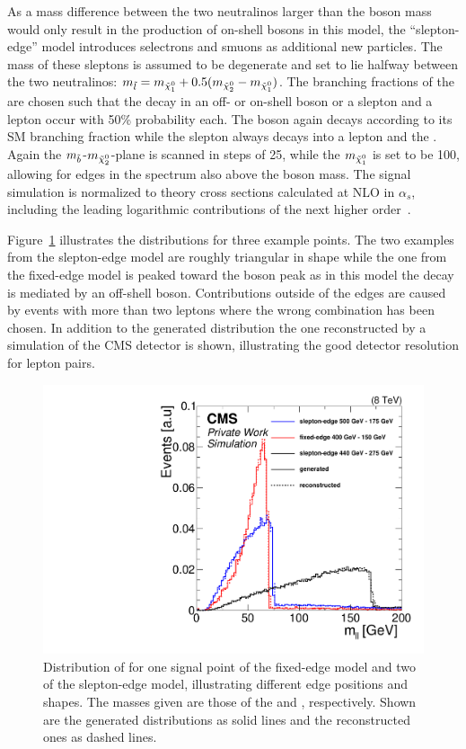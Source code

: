 As a mass difference between the two neutralinos larger than the \Z boson mass would only result in the production of on-shell \Z bosons in this model, the ``slepton-edge'' model introduces selectrons and smuons as additional new particles. The mass of these sleptons is assumed to be degenerate and set to lie halfway between the two neutralinos: $m_{\tilde{l}} = m_{{\tilde{\chi}^0_1}} + 0.5(m_{{\tilde{\chi}^0_2}}-m_{{\tilde{\chi}^0_1}})$. The branching fractions of the \secondchi are chosen such that the decay in an off- or on-shell \Z boson or a slepton and a lepton occur with 50\% probability each. The \Z boson again decays according to its SM branching fraction while the slepton always decays into a lepton and the \firstchi. Again the $m_{\tilde{b}}$-$m_{{\tilde{\chi}^0_2}}$-plane is scanned in steps of 25\GeV, while the $m_{{\tilde{\chi}^0_1}}$ is set to be 100\GeV, allowing for edges in the \mll spectrum also above the \Z boson mass. 
The signal simulation is normalized to theory cross sections calculated at NLO in $\alpha_s$, including the leading logarithmic contributions of the next higher order~\cite{bib-nlo-nll-01,bib-nlo-nll-02,bib-nlo-nll-03,bib-nlo-nll-04,bib-nlo-nll-05,ref:xsec}.

Figure~\ref{fig:SUSYMasses} illustrates the \mll distributions for three example points. The two examples from the slepton-edge model are roughly triangular in shape while the one from the fixed-edge model is peaked toward the \Z boson peak as in this model the decay is mediated by an off-shell \Z boson. Contributions outside of the edges are caused by events with more than two leptons where the wrong combination has been chosen. In addition to the generated distribution the one reconstructed by a simulation of the CMS detector is shown, illustrating the good detector resolution for lepton pairs.
\begin{figure}
\centering
\includegraphics[scale=0.3]{plots/THEO/SUSY_masses.pdf}
\caption{Distribution of \mll for one signal point of the fixed-edge model and two of the slepton-edge model, illustrating different edge positions and shapes. The masses given are those of the \sbottom and \secondchi, respectively. Shown are the generated distributions as solid lines and the reconstructed ones as dashed lines.}
\label{fig:SUSYMasses}
\end{figure}

